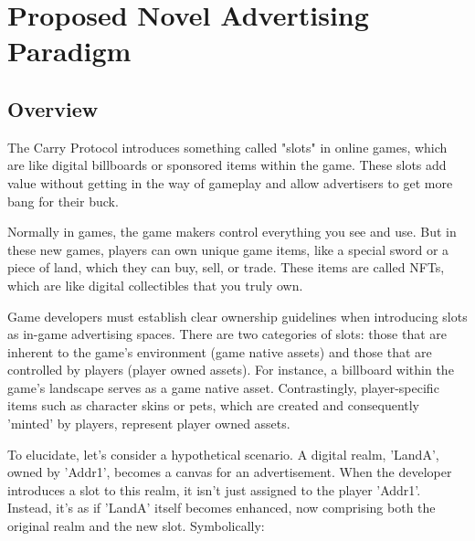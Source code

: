 \section{Proposed Novel Advertising Paradigm}

\subsection{Overview}




The Carry Protocol introduces something called "slots" in online games, which are like digital billboards or sponsored items within the game. These slots add value without getting in the way of gameplay and allow advertisers to get more bang for their buck.

Normally in games, the game makers control everything you see and use. But in these new games, players can own unique game items, like a special sword or a piece of land, which they can buy, sell, or trade. These items are called NFTs, which are like digital collectibles that you truly own.

Game developers must establish clear ownership guidelines when introducing slots as in-game advertising spaces. There are two categories of slots: those that are inherent to the game's environment (game native assets) and those that are controlled by players (player owned assets). For instance, a billboard within the game's landscape serves as a game native asset. Contrastingly, player-specific items such as character skins or pets, which are created and consequently 'minted' by players, represent player owned assets. 


To elucidate, let's consider a hypothetical scenario. A digital realm, 'LandA', owned by 'Addr1', becomes a canvas for an advertisement. When the developer introduces a slot to this realm, it isn't just assigned to the player 'Addr1'. Instead, it's as if 'LandA' itself becomes enhanced, now comprising both the original realm and the new slot. Symbolically:

